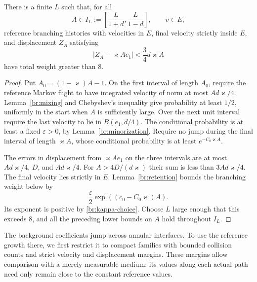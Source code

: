\begin{lemma}\label{br:reference-block}
There is a finite \(L\) such that, for all
\[
A\in I_L:=\left[\frac L{1+d},\frac L{1-d}\right],\qquad v\in E,
\]
reference branching histories with velocities in \(E\), final velocity
strictly inside \(E\), and displacement \(Z_A\) satisfying
\begin{equation}\label{br:strict-drift}
|Z_A-\varkappa Ae_1|<\frac34d\varkappa A
\end{equation}
have total weight greater than 8.
\end{lemma}

\begin{proof}
Put \(A_0=(1-\varkappa)A-1\). On the first interval of length \(A_0\),
require the reference Markov flight to have integrated velocity of
norm at most \(Ad\varkappa/4\). Lemma~\ref{br:mixing} and Chebyshev's
inequality give probability at least \(1/2\), uniformly in the start
when \(A\) is sufficiently large. Over the next unit interval require
the last velocity to lie in \(B(e_1,d/4)\). The conditional probability
is at least a fixed \(\varepsilon>0\), by
Lemma~\ref{br:minorization}. Require no jump during the final interval
of length \(\varkappa A\), whose conditional probability is at least
\(e^{-C_0\varkappa A}\).

The errors in displacement from \(\varkappa Ae_1\) on the three intervals
are at most \(Ad\varkappa/4\), \(D\), and \(Ad\varkappa/4\).
For \(A>4D/(d\varkappa)\) their sum is less than \(3Ad\varkappa/4\).
The final velocity lies strictly in \(E\).
Lemma~\ref{br:retention} bounds the branching weight below by
\[
\frac{\varepsilon}{2}\exp((c_0-C_0\varkappa)A).
\]
Its exponent is positive by \eqref{br:kappa-choice}. Choose \(L\)
large enough that this exceeds 8, and all the preceding lower bounds
on \(A\) hold throughout \(I_L\).
\end{proof}

The background coefficients jump across annular interfaces. To use the
reference growth there, we first restrict it to compact families with
bounded collision counts and strict velocity and displacement margins.
These margins allow comparison with a merely measurable medium: its
values along each actual path need only remain close to the constant
reference values.

